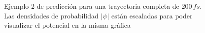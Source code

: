 \begin{figure}[H]
  \centering
  \caption{Ejemplo 2 de predicción para una trayectoria completa de $200\,fs$.\\ Las densidades de probabilidad $|\psi|$ están escaladas para poder visualizar el potencial en la misma gráfica}
  \label{fig:trajec2}
\end{figure}

